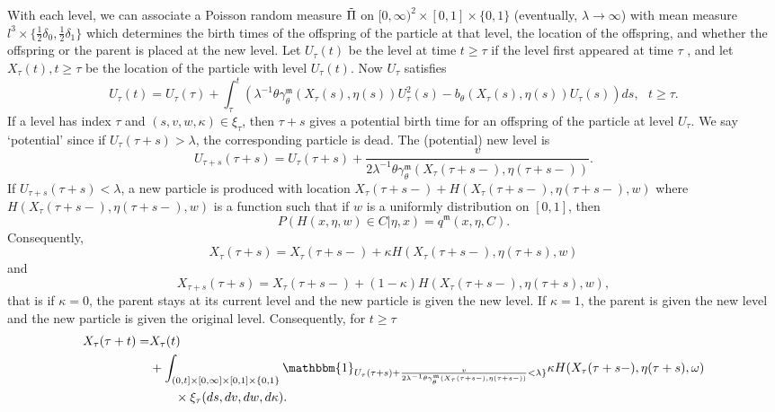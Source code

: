 \documentclass[12pt]{article}
\begin{document}
With each level,
we can associate a Poisson random measure
$\Tilde{\Pi}$ on $[0, \infty)^2\times [0,1]\times \{0,1\}$ (eventually, $\lambda \to \infty$) with mean measure $l^3 \times \{\frac{1}{2}\delta_0,\frac{1}{2}\delta_1\}$ which
determines the birth times of the offspring of the particle at that level, the location of the
offspring, and whether the offspring or the parent is placed at the new level. Let $U_{\tau}(t)$ be
the level at time $t \geq \tau$ if the level first appeared at time $\tau$ , and let $X_{\tau}(t), t \geq \tau$ be the
location of the particle with level $U_{\tau}(t)$. 
Now $U_{\tau}$ satisfies
\begin{equation}
U_{\tau}(t)=U_{\tau}(\tau)+\int_{\tau}^{t}(\lambda^{-1} \theta \gamma^{\mathfrak{m}}_{\theta}(X_{\tau}(s),\eta(s))U^2_{\tau}(s)-b_{\theta}(X_{\tau}(s),\eta(s))U_{\tau}(s))ds, ~~~ t \geq \tau.    
\end{equation}
If a level has index $\tau$ and $(s,v,w,\kappa)\in \xi_\tau$, then $\tau+s$ gives a potential birth time for an offspring of the particle at level $U_{\tau}$. We say `potential' since if $U_{\tau}(\tau+s)>\lambda$, the corresponding particle is dead. The (potential) new level is 
\begin{equation}\label{New birth potential level}
    U_{\tau+s}(\tau+s)=U_{\tau}(\tau+s)+ \frac{v}{2\lambda^{-1} \theta \gamma^{\mathfrak{m}}_{\theta}(X_{\tau}(\tau+s-), \eta(\tau+s-))}.
\end{equation}
If $U_{\tau+s}(\tau+s)< \lambda$, a new particle is produced with location $X_{\tau}(\tau+s-)+H(X_{\tau}(\tau+s-), \eta(\tau+s-),w)$ where $H(X_{\tau}(\tau+s-), \eta(\tau+s-),w)$ is a function such that if $w$ is a uniformly distribution on $[0,1]$, then 
\begin{equation}\label{eq: Individual Evolution Jump Kernel}
P(H(x, \eta,w)\in C | \eta,x)=q^{\mathfrak{m}}(x, \eta,C).    
\end{equation}
Consequently, 
$$X_{\tau}(\tau+s)=X_{\tau}(\tau+s-)+\kappa H(X_{\tau}(\tau+s-), \eta(\tau+s),w)$$
and 
$$X_{\tau+s}(\tau+s)=X_{\tau}(\tau+s-)+(1-\kappa) H(X_{\tau}(\tau+s-), \eta(\tau+s),w),$$
that is if $\kappa=0$, the parent stays at its current level and the new particle is given the new
level. If $\kappa = 1 $, the parent is given the new level and the new particle is given the original
level. Consequently, for $t \geq \tau$
\begin{align}\label{eq: Spatial evolution of individual lineage}
X_{\tau}(\tau+t)=&X_{\tau}(t)\\
&+\int_{(0,t]\times[0,\infty]\times[0,1]\times\{0,1\}}\mathbbm{1}_{U_{\tau}(\tau+s)+ \frac{v}{2\lambda^{-1} \theta \gamma^{\mathfrak{m}}_{\theta}(X_{\tau}(\tau+s-), \eta(\tau+s-))}<\lambda\}}\kappa    H(X_{\tau}(\tau+s-), \eta(\tau+s),\omega) \\
&\qquad \times \xi_{\tau}(ds,dv,dw,d\kappa).
\end{align}
\end{document}
